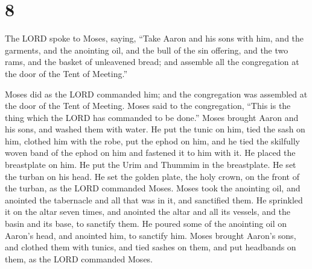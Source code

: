 \hypertarget{section-7}{%
\section{8}\label{section-7}}

 The LORD spoke to Moses, saying,  ``Take Aaron
and his sons with him, and the garments, and the anointing oil, and the
bull of the sin offering, and the two rams, and the basket of unleavened
bread;  and assemble all the congregation at the door of the
Tent of Meeting.''

 Moses did as the LORD commanded him; and the congregation
was assembled at the door of the Tent of Meeting.  Moses
said to the congregation, ``This is the thing which the LORD has
commanded to be done.''  Moses brought Aaron and his sons,
and washed them with water.  He put the tunic on him, tied
the sash on him, clothed him with the robe, put the ephod on him, and he
tied the skilfully woven band of the ephod on him and fastened it to him
with it.  He placed the breastplate on him. He put the Urim
and Thummim in the breastplate.  He set the turban on his
head. He set the golden plate, the holy crown, on the front of the
turban, as the LORD commanded Moses.  Moses took the
anointing oil, and anointed the tabernacle and all that was in it, and
sanctified them.  He sprinkled it on the altar seven times,
and anointed the altar and all its vessels, and the basin and its base,
to sanctify them.  He poured some of the anointing oil on
Aaron's head, and anointed him, to sanctify him.  Moses
brought Aaron's sons, and clothed them with tunics, and tied sashes on
them, and put headbands on them, as the LORD commanded Moses.

